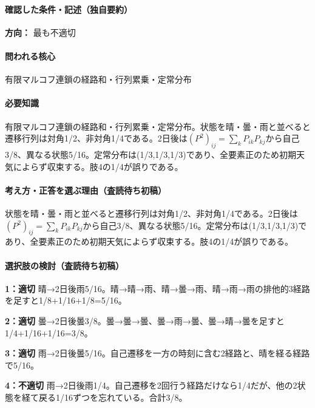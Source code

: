 \paragraph{確認した条件・記述（独自要約）}\mbox{}\par

\noindent\textbf{方向：} 最も不適切\par

\paragraph{問われる核心} 有限マルコフ連鎖の経路和・行列累乗・定常分布

\paragraph{必要知識} 有限マルコフ連鎖の経路和・行列累乗・定常分布。状態を晴・曇・雨と並べると遷移行列は対角1/2、非対角1/4である。2日後は\((P^2)_{ij}=\sum_kP_{ik}P_{kj}\)から自己3/8、異なる状態5/16。定常分布は(1/3,1/3,1/3)であり、全要素正のため初期天気によらず収束する。肢4の1/4が誤りである。

\paragraph{考え方・正答を選ぶ理由（査読待ち初稿）} 状態を晴・曇・雨と並べると遷移行列は対角1/2、非対角1/4である。2日後は\((P^2)_{ij}=\sum_kP_{ik}P_{kj}\)から自己3/8、異なる状態5/16。定常分布は(1/3,1/3,1/3)であり、全要素正のため初期天気によらず収束する。肢4の1/4が誤りである。

\paragraph{選択肢の検討（査読待ち初稿）}\mbox{}\par

\noindent\textbf{1：適切} 晴→2日後雨5/16。晴→晴→雨、晴→曇→雨、晴→雨→雨の排他的3経路を足すと1/8+1/16+1/8=\allowbreak{}5/16。\par

\noindent\textbf{2：適切} 曇→2日後曇3/8。曇→曇→曇、曇→雨→曇、曇→晴→曇を足すと1/4+1/16+1/16=\allowbreak{}3/8。\par

\noindent\textbf{3：適切} 雨→2日後曇5/16。自己遷移を一方の時刻に含む2経路と、晴を経る経路で5/16。\par

\noindent\textbf{4：不適切} 雨→2日後雨1/4。自己遷移を2回行う経路だけなら1/4だが、他の2状態を経て戻る1/16ずつを忘れている。合計3/8。\par

